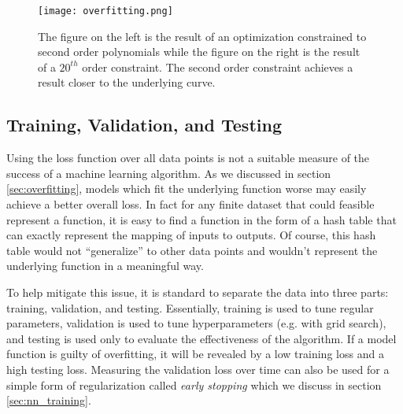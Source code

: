 \begin{figure}
    \centering
    \texttt{[image: overfitting.png]}
    \caption{The figure on the left is the result of an optimization constrained to second order polynomials while the figure on the right is the result of a $20^{th}$ order constraint.  The second order constraint achieves a result closer to the underlying curve.}
    \label{fig:poly_reg}
\end{figure}

\subsection{Training, Validation, and Testing}
Using the loss function over all data points is not a suitable measure of the success of a machine learning algorithm.  As we discussed in section \ref{sec:overfitting}, models which fit the underlying function worse may easily achieve a better overall loss.  In fact for any finite dataset that could feasible represent a function, it is easy to find a function in the form of a hash table that can exactly represent the mapping of inputs to outputs.  Of course, this hash table would not ``generalize'' to other data points and wouldn't represent the underlying function in a meaningful way.  

To help mitigate this issue, it is standard to separate the data into three parts: training, validation, and testing.  Essentially, training is used to tune regular parameters, validation is used to tune hyperparameters (e.g. with grid search), and testing is used only to evaluate the effectiveness of the algorithm.  If a model function is guilty of overfitting, it will be revealed by a low training loss and a high testing loss.  Measuring the validation loss over time can also be used for a simple form of regularization called \textit{early stopping} which we discuss in section \ref{sec:nn_training}.
